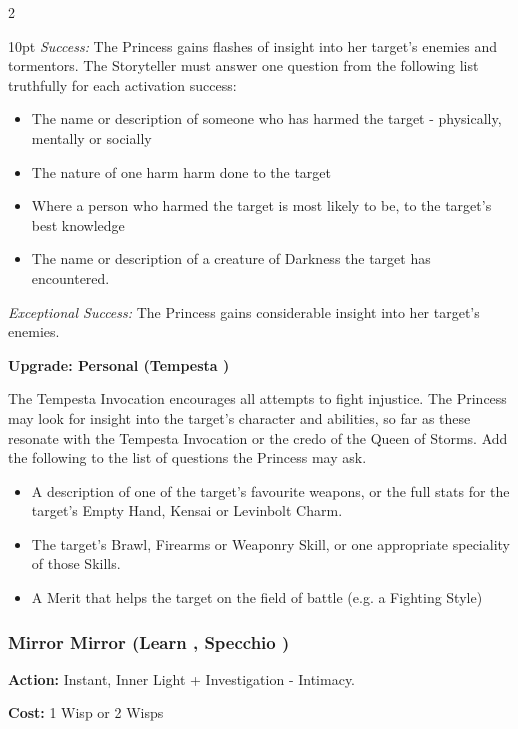 \begin{multicols}{2}
\begin{myindentpar}{10pt}
\emph{Success:} The Princess gains flashes of insight into her target's enemies and tormentors. The Storyteller must answer one question from the following list truthfully for each activation success:

\begin{itemize}
\item The name or description of someone who has harmed the target - physically, mentally or socially
\item The nature of one harm harm done to the target
\item Where a person who harmed the target is most likely to be, to the target's best knowledge
\item The name or description of a creature of Darkness the target has encountered.
\end{itemize}

\emph{Exceptional Success:} The Princess gains considerable insight into her target's enemies.

\textbf{Upgrade: Personal (Tempesta \textbullet\textbullet)}

The Tempesta Invocation encourages all attempts to fight injustice. The Princess may look for insight into the target's character and abilities, so far as these resonate with the Tempesta Invocation or the credo of the Queen of Storms. Add the following to the list of questions the Princess may ask.
\begin{itemize}
\item A description of one of the target's favourite weapons, or the full stats for the target's Empty Hand, Kensai or Levinbolt Charm. 
\item The target's Brawl, Firearms or Weaponry Skill, or one appropriate speciality of those Skills. 
\item A Merit that helps the target on the field of battle (e.g. a Fighting Style)\end{itemize}
\end{myindentpar}
                                         

\subsubsection*{Mirror Mirror (Learn \textbullet\textbullet, Specchio \textbullet\textbullet)}

\noindent \textbf{Action:} Instant, Inner Light + Investigation - Intimacy.

\noindent \textbf{Cost:} 1 Wisp or 2 Wisps


\end{multicols}
